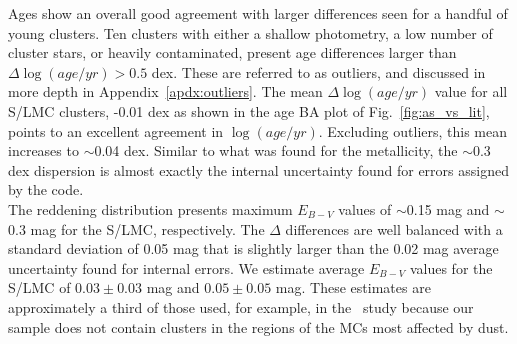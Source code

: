 \documentclass{aa}
\begin{document}
Ages show an overall good agreement with larger differences seen for a handful
of young clusters. Ten clusters with either a shallow photometry, a low number
of cluster stars, or heavily contaminated, present age differences larger than
$\Delta \log(age/yr){>}0.5$ dex. These are referred to as outliers, and
discussed in more depth in Appendix~\ref{apdx:outliers}.
%
%
The mean $\Delta \log(age/yr)$ value for all S/LMC clusters, -0.01 dex as shown
in the age BA plot of Fig.~\ref{fig:as_vs_lit}, points to an excellent agreement
in $\log(age/yr)$. Excluding outliers, this mean increases to $\sim$0.04 dex.
Similar to what was found for the metallicity, the $\sim$0.3 dex dispersion
is almost exactly the internal uncertainty found for errors assigned by the
code.\\

The reddening distribution presents maximum $E_{B-V}$ values of $\sim$0.15
mag and $\sim$0.3 mag for the S/LMC, respectively.
The $\Delta$ differences are well balanced with a standard deviation of 0.05
mag that is slightly larger than the 0.02 mag average uncertainty found for internal
errors. We estimate average $E_{B-V}$ values for the S/LMC of $0.03{\pm}0.03$
mag and $0.05{\pm}0.05$ mag.
These estimates are approximately a third of those used, for example, in
the~\cite{Hunter_2003} study because our sample does not contain clusters in the
regions of the MCs most affected by dust.\\
\end{document}
